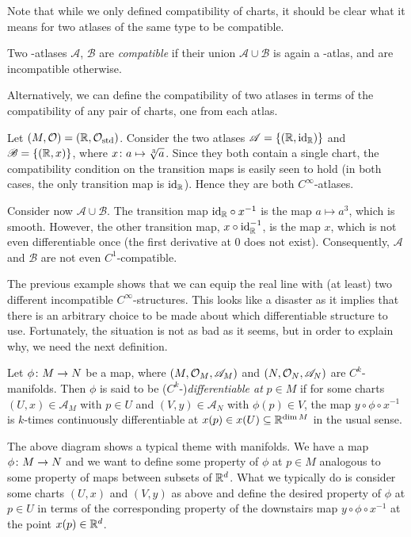 Note that while we only defined compatibility of charts, it should be clear what it means for two atlases of the same type to be compatible.

\bd
Two {\scalebox{0.75}\FiveFlowerOpen}-atlases $\mathscr{A}$, $\mathscr{B}$ are \emph{compatible} if their union $\mathscr{A}\cup\mathscr{B}$ is again a {\scalebox{0.75}\FiveFlowerOpen}-atlas, and are incompatible otherwise.
\ed

Alternatively, we can define the compatibility of two atlases in terms of the compatibility of any pair of charts, one from each atlas.

\be
Let $(M,\mathcal{O})=(\mathbb{R},\mathcal{O}_\mathrm{std})$. Consider the two atlases $\mathscr{A}=\{(\mathbb{R},\mathrm{id}_{\mathbb{R}})\}$ and $\mathscr{B}=\{(\mathbb{R},x)\}$, where $x\colon a \mapsto \sqrt[3]{a}$. Since they both contain a single chart, the compatibility condition on the transition maps is easily seen to hold (in both cases, the only transition map is $\mathrm{id}_{\mathbb{R}}$). Hence they are both $C^\infty$-atlases.

Consider now $\mathscr{A}\cup\mathscr{B}$. The transition map $\mathrm{id}_{\mathbb{R}}\circ x^{-1}$ is the map $a\mapsto a^3$, which is smooth. However, the other transition map, $x\circ\mathrm{id}_{\mathbb{R}}^{-1}$, is the map $x$, which is not even differentiable once (the first derivative at $0$ does not exist). Consequently, $\mathscr{A}$ and $\mathscr{B}$ are not even $C^1$-compatible.
\ee

The previous example shows that we can equip the real line with (at least) two different incompatible $C^\infty$-structures. This looks like a disaster as it implies that there is an arbitrary choice to be made about which differentiable structure to use. Fortunately, the situation is not as bad as it seems, but in order to explain why, we need the next definition.

\bd
Let $\phi\colon M\to N$ be a map, where $(M,\mathcal{O}_M,\mathscr{A}_M)$ and $(N,\mathcal{O}_N,\mathscr{A}_N)$ are $C^k$-manifolds. Then $\phi$ is said to be ($C^k$-)\emph{differentiable at} $p\in M$ if for some charts $(U,x)\in\mathscr{A}_M$ with $p\in U$ and $(V,y)\in\mathscr{A}_N$ with $\phi(p)\in V$, the map $y\circ\phi\circ x^{-1}$ is $k$-times continuously differentiable at $x(p)\in x(U)\subseteq\mathbb{R}^{\dim M}$ in the usual sense.
\bse
{}
\ese
\ed
The above diagram shows a typical theme with manifolds. We have a map $\phi\colon M\to N$ and we want to define some property of $\phi$ at $p\in M$ analogous to some property of maps between subsets of $\mathbb{R}^d$. What we typically do is consider some charts $(U,x)$ and $(V,y)$ as above and define the desired property of $\phi$ at $p\in U$ in terms of the corresponding property of the downstairs map $y\circ\phi\circ x^{-1}$ at the point $x(p)\in\mathbb{R}^d$.

